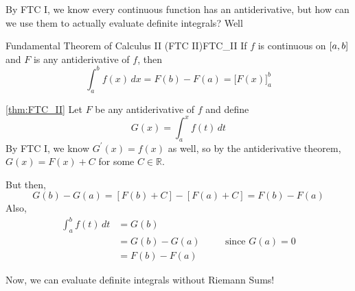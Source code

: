 By FTC I, we know every continuous function has an antiderivative,
but how can we use them to actually evaluate definite integrals?
Well\textellipsis{}

\begin{Theorem}{Fundamental Theorem of Calculus II (FTC II)}{FTC_II}
    If $ f $ is continuous on $ \interval{a}{b} $ and $ F $
    is any antiderivative of $ f $, then
    \[ \int_{a}^{b} f(x)\, d{x} =F(b)-F(a)
        =\bigl[F(x)\bigr]_{a}^b \]
\end{Theorem}

\begin{Proof}{\ref{thm:FTC_II}}{}
    Let $ F $ be any antiderivative of $ f $ and define
    \[ G(x)=\int_{a}^{x} f(t)\, d{t} \]
    By FTC I, we know $ G^\prime(x)=f(x) $ as well, so by the
    antiderivative theorem, $ G(x)=F(x)+C $ for some $ C\in\mathbb{R} $.

    But then,
    \[ G(b)-G(a)=[F(b)+C]-[F(a)+C]=F(b)-F(a) \]
    Also,
    \begin{align*}
        \int_{a}^{b} f(t)\, d{t}
         & =G(b)                                    \\
         & =G(b)-G(a) & \quad & \text{since }G(a)=0 \\
         & =F(b)-F(a)
    \end{align*}
\end{Proof}

Now, we can evaluate definite integrals without Riemann Sums!

